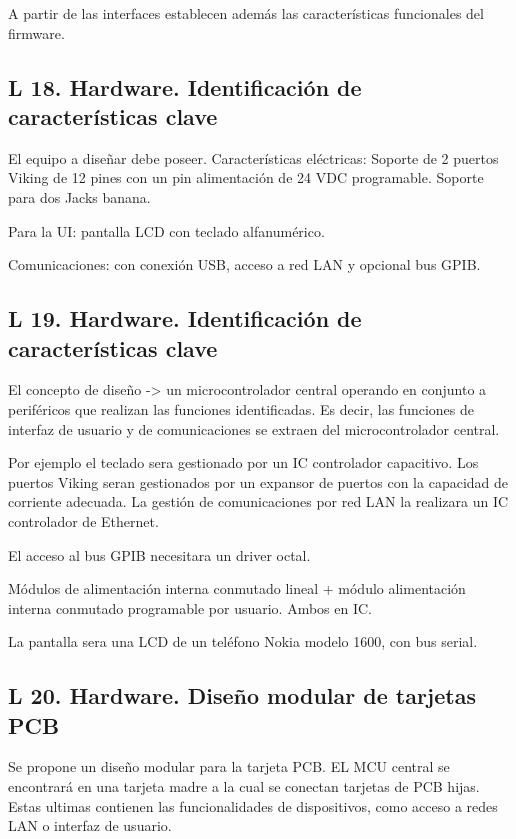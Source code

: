 \documentclass[paper=letter,oneside,fontsize=9pt]{scrartcl}
\begin{document}
	A partir de las interfaces establecen además las características funcionales del firmware.
	
	\subsection{L 18. Hardware. Identificación de características clave} 
	
	El equipo a diseñar debe poseer. Características eléctricas: Soporte de 2 puertos Viking de 12 pines con un pin alimentación de 24 VDC programable. Soporte para dos Jacks banana.
	
	Para la UI: pantalla LCD con teclado alfanumérico.
	
	Comunicaciones: con conexión USB, acceso a red LAN y opcional bus GPIB.
	
	\subsection{L 19. Hardware. Identificación de características clave} 
	
	El concepto de diseño -> un microcontrolador central operando en conjunto a periféricos que realizan las funciones identificadas. Es decir, las funciones de interfaz de usuario y de comunicaciones se extraen del microcontrolador central.
	
	Por ejemplo el teclado sera gestionado por un IC controlador capacitivo. Los puertos Viking seran gestionados por un expansor de puertos con la capacidad de corriente adecuada. La gestión de comunicaciones por red LAN la realizara un IC controlador de Ethernet.
	
	El acceso al bus GPIB necesitara un driver octal.
	
	Módulos de alimentación interna conmutado lineal + módulo alimentación interna conmutado programable por usuario. Ambos en IC.
	
	La pantalla sera una LCD de un teléfono Nokia modelo 1600, con bus serial.
	
	\subsection{L 20. Hardware. Diseño modular de tarjetas PCB} 
	
	Se propone un diseño modular para la tarjeta PCB. EL MCU central se encontrará en una tarjeta madre a la cual se conectan tarjetas de PCB hijas. Estas ultimas contienen las funcionalidades de dispositivos, como acceso a redes LAN o interfaz de usuario.
	
\end{document}
